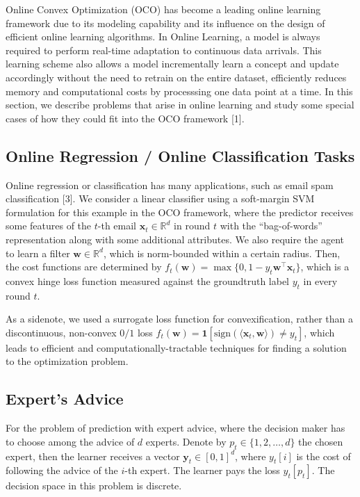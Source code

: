 \documentclass{article}
\begin{document}
Online Convex Optimization (OCO) has become a leading online learning framework due to its modeling capability and its influence on the design of efficient online learning algorithms.
In Online Learning, a model is always required to perform real-time adaptation to continuous data arrivals. This learning scheme also allows a model incrementally learn a concept and update accordingly without the need to retrain on the entire dataset, efficiently reduces memory and computational costs by processsing one data point at a time.
In this section, we describe problems that arise in online learning and study some special cases of how they could fit into the OCO framework [1].

\subsection{Online Regression / Online Classification Tasks}

Online regression or classification has many applications, such as email spam classification [3].
We consider a linear classifier using a soft-margin SVM formulation for this example in the OCO framework, where the predictor receives some features of the $t$-th email $\textbf{x}_t\in \mathbb{R}^d$ in round $t$ with the ``bag-of-words'' representation along with some additional attributes.
We also require the agent to learn a filter $\textbf{w}\in\mathbb{R}^d$, which is norm-bounded within a certain radius.
Then, the cost functions are determined by $f_t(\textbf{w})=\max\{0, 1-y_t\textbf{w}^\top\textbf{x}_t\}$, which is a convex hinge loss function measured against the groundtruth label $y_t$ in every round $t$.

As a sidenote, we used a surrogate loss function for convexification, rather than a discontinuous, non-convex $0/1$ loss $f_t(\textbf{w})=\bm{1}[\text{sign}(\langle \textbf{x}_t, \textbf{w}\rangle )\neq y_t]$, which leads to efficient and computationally-tractable techniques for finding a solution to the optimization problem.

\subsection{Expert's Advice}

For the problem of prediction with expert advice, where the decision maker has to choose among the advice of $d$ experts. Denote by $p_t\in \{1,2,\ldots, d\}$ the chosen expert, then the learner receives a vector $\textbf{y}_t\in [0,1]^d$, where $y_t[i]$ is the cost of following the advice of the $i$-th expert. The learner pays the loss $y_t[p_t]$. The decision space in this problem is discrete.
\end{document}
